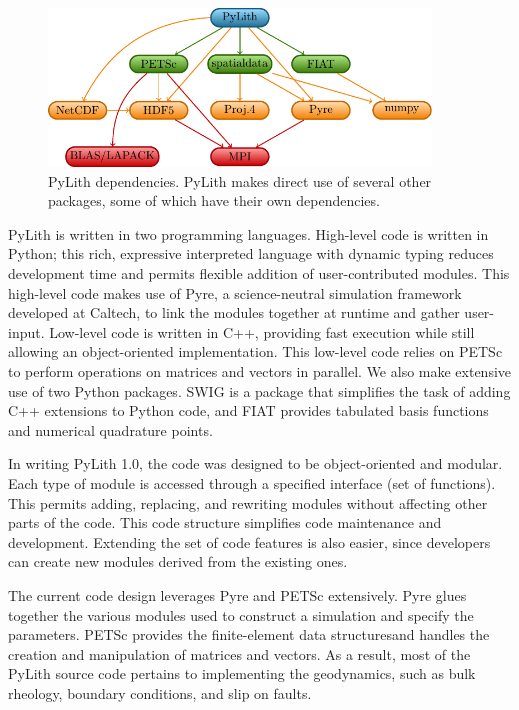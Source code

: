 \noindent \begin{center}
\begin{figure}[H]
\centering{}\includegraphics[width=4in]{intro/figs/packages}\caption{\label{fig:pylith-dependencies}PyLith dependencies. PyLith makes
direct use of several other packages, some of which have their own
dependencies.}
\end{figure}

\par\end{center}

PyLith is written in two programming languages. High-level code is
written in Python; this rich, expressive interpreted language with
dynamic typing reduces development time and permits flexible addition
of user-contributed modules. This high-level code makes use of Pyre,
a science-neutral simulation framework developed at Caltech, to link
the modules together at runtime and gather user-input. Low-level code
is written in C++, providing fast execution while still allowing an
object-oriented implementation. This low-level code relies on PETSc
to perform operations on matrices and vectors in parallel. We also
make extensive use of two Python packages. SWIG is a package that
simplifies the task of adding C++ extensions to Python code, and FIAT
provides tabulated basis functions and numerical quadrature points. 

In writing PyLith 1.0, the code was designed to be object-oriented
and modular. Each type of module is accessed through a specified interface
(set of functions). This permits adding, replacing, and rewriting
modules without affecting other parts of the code. This code structure
simplifies code maintenance and development. Extending the set of
code features is also easier, since developers can create new modules
derived from the existing ones.

The current code design leverages Pyre and PETSc extensively. Pyre
glues together the various modules used to construct a simulation
and specify the parameters. PETSc provides the finite-element data
structuresand handles the creation and manipulation of matrices and
vectors. As a result, most of the PyLith source code pertains to implementing
the geodynamics, such as bulk rheology, boundary conditions, and slip
on faults. 


